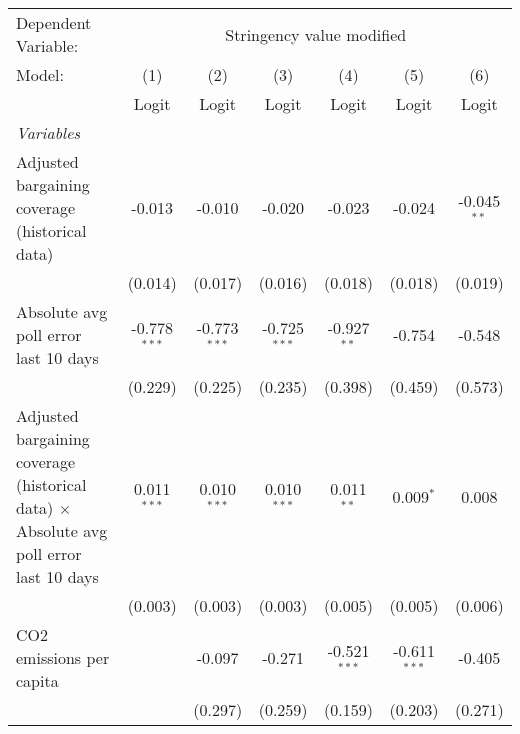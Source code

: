 
\begingroup
\centering
\begin{tabular}{lcccccc}
   \toprule
   Dependent Variable: & \multicolumn{6}{c}{Stringency value modified}\\
   Model:                                                                                        & (1)            & (2)            & (3)            & (4)            & (5)            & (6)\\  
                                                                                                 &  Logit         & Logit          & Logit          & Logit          & Logit          & Logit\\  
   \midrule
   \emph{Variables}\\
   Adjusted bargaining coverage (historical data)                                                & -0.013         & -0.010         & -0.020         & -0.023         & -0.024         & -0.045$^{**}$\\   
                                                                                                 & (0.014)        & (0.017)        & (0.016)        & (0.018)        & (0.018)        & (0.019)\\   
   Absolute avg poll error last 10 days                                                          & -0.778$^{***}$ & -0.773$^{***}$ & -0.725$^{***}$ & -0.927$^{**}$  & -0.754         & -0.548\\   
                                                                                                 & (0.229)        & (0.225)        & (0.235)        & (0.398)        & (0.459)        & (0.573)\\   
   Adjusted bargaining coverage (historical data) $\times$ Absolute avg poll error last 10 days  & 0.011$^{***}$  & 0.010$^{***}$  & 0.010$^{***}$  & 0.011$^{**}$   & 0.009$^{*}$    & 0.008\\   
                                                                                                 & (0.003)        & (0.003)        & (0.003)        & (0.005)        & (0.005)        & (0.006)\\   
   CO2 emissions per capita                                                                      &                & -0.097         & -0.271         & -0.521$^{***}$ & -0.611$^{***}$ & -0.405\\   
                                                                                                 &                & (0.297)        & (0.259)        & (0.159)        & (0.203)        & (0.271)\\   

\end{tabular}
